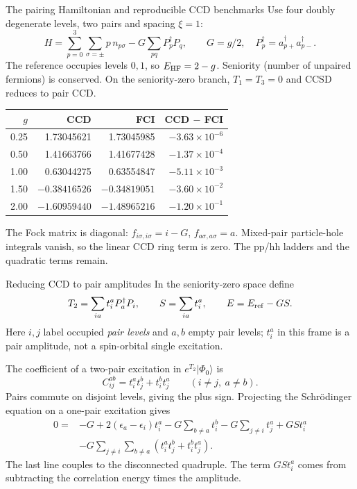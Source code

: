 \documentclass[aspectratio=169,10pt]{beamer}
\newcommand{\ket}[1]{\vert #1\rangle}
\newcommand{\ph}{\Phi_0}
\begin{document}
\begin{frame}{The pairing Hamiltonian and reproducible CCD benchmarks}
Use four doubly degenerate levels, two pairs and spacing $\xi=1$:
\[
 H=\sum_{p=0}^{3}\sum_{\sigma=\pm}p\,n_{p\sigma}
 -G\sum_{pq}P_p^\dagger P_q,\qquad
 G=g/2,\quad P_p^\dagger=a_{p+}^\dagger a_{p-}^\dagger.
\]
The reference occupies levels $0,1$, so $E_{\rm HF}=2-g$. Seniority (number of unpaired fermions) is conserved. On the seniority-zero branch, $T_1=T_3=0$ and CCSD reduces to pair CCD.
\begin{center}
\begin{tabular}{rrrr}
\toprule
$g$ & CCD & FCI & CCD $-$ FCI\\
\midrule
0.25 & 1.73045621 & 1.73045985 & $-3.63\times10^{-6}$\\
0.50 & 1.41663766 & 1.41677428 & $-1.37\times10^{-4}$\\
1.00 & 0.63044275 & 0.63554847 & $-5.11\times10^{-3}$\\
1.50 & $-0.38416526$ & $-0.34819051$ & $-3.60\times10^{-2}$\\
2.00 & $-1.60959440$ & $-1.48965216$ & $-1.20\times10^{-1}$\\
\bottomrule
\end{tabular}
\end{center}
The Fock matrix is diagonal: $f_{i\sigma,i\sigma}=i-G$, $f_{a\sigma,a\sigma}=a$. Mixed-pair particle-hole integrals vanish, so the linear CCD ring term is zero. The pp/hh ladders and the quadratic terms remain.
\end{frame}
\begin{frame}{Reducing CCD to pair amplitudes}
\small
In the seniority-zero space define
\[
 T_2=\sum_{ia}t_i^a P_a^\dagger P_i,\qquad
 S=\sum_{ia}t_i^a,\qquad E=E_{\rm ref}-G S.
\]
Here $i,j$ label occupied \emph{pair levels} and $a,b$ empty pair levels; $t_i^a$ in this frame is a pair amplitude, not a spin-orbital single excitation.
\medskip

The coefficient of a two-pair excitation in $e^{T_2}\ket{\ph}$ is
\[
 C_{ij}^{ab}=t_i^a t_j^b+t_i^b t_j^a\qquad(i\ne j,\ a\ne b).
\]
Pairs commute on disjoint levels, giving the plus sign. Projecting the Schr\"odinger equation on a one-pair excitation gives
\begin{align*}
0={}&-G+2(\epsilon_a-\epsilon_i)t_i^a
 -G\sum_{b\ne a}t_i^b-G\sum_{j\ne i}t_j^a+G S t_i^a\\
 &-G\sum_{j\ne i}\sum_{b\ne a}(t_i^a t_j^b+t_i^b t_j^a).
\end{align*}
The last line couples to the disconnected quadruple. The term $G S t_i^a$ comes from subtracting the correlation energy times the amplitude.
\end{frame}
\end{document}

